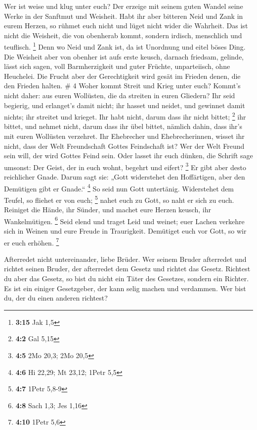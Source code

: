  Wer ist weise und klug unter euch? Der erzeige mit
seinem guten Wandel seine Werke in der Sanftmut und Weisheit.
 Habt ihr aber bitteren Neid und Zank in eurem Herzen, so
rühmet euch nicht und lüget nicht wider die Wahrheit. 
Das ist nicht die Weisheit, die von obenherab kommt, sondern irdisch,
menschlich und teuflisch. \footnote{\textbf{3:15} Jak 1,5}
 Denn wo Neid und Zank ist, da ist Unordnung und eitel
böses Ding.  Die Weisheit aber von obenher ist aufs erste
keusch, darnach friedsam, gelinde, lässt sich sagen, voll Barmherzigkeit
und guter Früchte, unparteiisch, ohne Heuchelei.  Die
Frucht aber der Gerechtigkeit wird gesät im Frieden denen, die den
Frieden halten. \# 4  Woher kommt Streit und Krieg unter
euch? Kommt's nicht daher: aus euren Wollüsten, die da streiten in euren
Gliedern?  Ihr seid begierig, und erlanget's damit nicht;
ihr hasset und neidet, und gewinnet damit nichts; ihr streitet und
krieget. Ihr habt nicht, darum dass ihr nicht bittet; \footnote{\textbf{4:2}
  Gal 5,15}  ihr bittet, und nehmet nicht, darum dass ihr
übel bittet, nämlich dahin, dass ihr's mit euren Wollüsten verzehret.
 Ihr Ehebrecher und Ehebrecherinnen, wisset ihr nicht,
dass der Welt Freundschaft Gottes Feindschaft ist? Wer der Welt Freund
sein will, der wird Gottes Feind sein.  Oder lasset ihr
euch dünken, die Schrift sage umsonst: Der Geist, der in euch wohnt,
begehrt und eifert? \footnote{\textbf{4:5} 2Mo 20,3; 2Mo 20,5}
 Er gibt aber desto reichlicher Gnade. Darum sagt sie:
„Gott widerstehet den Hoffärtigen, aber den Demütigen gibt er Gnade.``
\footnote{\textbf{4:6} Hi 22,29; Mt 23,12; 1Petr 5,5}  So
seid nun Gott untertänig. Widerstehet dem Teufel, so fliehet er von
euch; \footnote{\textbf{4:7} 1Petr 5,8-9}  nahet euch zu
Gott, so naht er sich zu euch. Reiniget die Hände, ihr Sünder, und
machet eure Herzen keusch, ihr Wankelmütigen. \footnote{\textbf{4:8}
  Sach 1,3; Jes 1,16}  Seid elend und traget Leid und
weinet; euer Lachen verkehre sich in Weinen und eure Freude in
Traurigkeit.  Demütiget euch vor Gott, so wir er euch
erhöhen. \footnote{\textbf{4:10} 1Petr 5,6}

 Afterredet nicht untereinander, liebe Brüder. Wer seinem
Bruder afterredet und richtet seinen Bruder, der afterredet dem Gesetz
und richtet das Gesetz. Richtest du aber das Gesetz, so bist du nicht
ein Täter des Gesetzes, sondern ein Richter.  Es ist ein
einiger Gesetzgeber, der kann selig machen und verdammen. Wer bist du,
der du einen anderen richtest?

